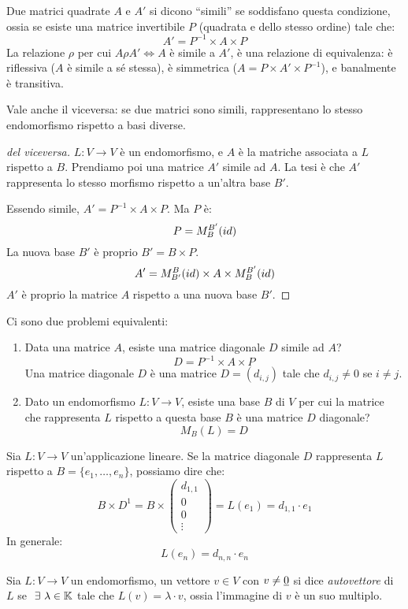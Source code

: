 \begin{defn}
Due matrici quadrate $A$ e $A'$ si dicono ``simili'' se soddisfano questa condizione, ossia se esiste una matrice invertibile $P$ (quadrata e dello stesso ordine) tale che:
\[
A' = P^{-1} \times A \times P
\]
La relazione $\rho$ per cui $A \rho A' \iff A$ \`e simile a $A'$, \`e una relazione di equivalenza: \`e riflessiva ($A$ \`e simile a s\'e stessa), \`e simmetrica ($A = P \times A' \times P^{-1}$), e banalmente \`e transitiva.

Vale anche il viceversa: se due matrici sono simili, rappresentano lo stesso endomorfismo rispetto a basi diverse.
\end{defn}
\begin{proof}[del viceversa]
$L : V \to V$ \`e un endomorfismo, e $A$ \`e la matriche associata a $L$ rispetto a $B$. Prendiamo poi una matrice $A'$ simile ad $A$. La tesi \`e che $A'$ rappresenta lo stesso morfismo rispetto a un'altra base $B'$.

Essendo simile, $A' = P^{-1} \times A \times P$. Ma $P$ \`e:
\[
P = M_{B}^{B'} (id)
\]
La nuova base $B'$ \`e proprio $B' = B \times P$.
\[
A' = M_{B'}^{B} (id) \times A \times M_{B}^{B'} (id)
\]
$A'$ \`e proprio la matrice $A$ rispetto a una nuova base $B'$.
\end{proof}


Ci sono due problemi equivalenti:
\begin{enumerate}
    \item Data una matrice $A$, esiste una matrice diagonale $D$ simile ad $A$?
    \[
    D = P^{-1} \times A \times P
    \]
    Una matrice diagonale $D$ \`e una matrice $D = (d_{i,j}) $ tale che $ d_{i,j} \neq 0 $ se $ i \neq j$.
    \item Dato un endomorfismo $L : V \to V$, esiste una base $B$ di $V$ per cui la matrice che rappresenta $L$ rispetto a questa base $B$ \`e una matrice $D$ diagonale?
    \[
    M_{B} (L) = D
    \]
\end{enumerate}

Sia $L : V \to V$ un'applicazione lineare. Se la matrice diagonale $D$ rappresenta $L$ rispetto a $B = \{ e_1, \ldots, e_n \}$, possiamo dire che:
\[
B \times D^{1} = B \times 
\begin{pmatrix}
d_{1,1} \\ 0 \\ 0 \\ \vdots
\end{pmatrix} = L(e_1) = d_{1,1} \cdot e_1
\]
In generale:
\[
L(e_n) = d_{n,n} \cdot e_n
\]
\begin{defn}
Sia $L : V \to V$ un endomorfismo, un vettore $v \in V$ con $v \neq \underline{0}$ si dice \emph{autovettore} di $L$ se $\exists \lambda \in \field$ tale che $L(v) = \lambda \cdot v$, ossia l'immagine di $v$ \`e un suo multiplo.
\end{defn}

